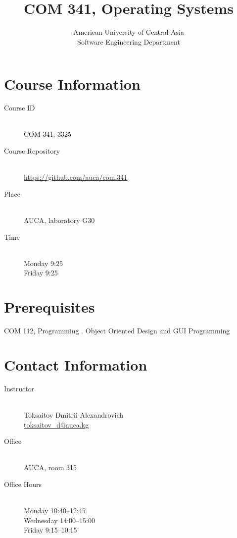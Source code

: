 \documentclass[12pt,a4paper,oneside]{article}
\newcommand{\R}[1]{\uppercase\expandafter{\romannumeral #1\relax}}
\begin{document}
    \title{COM 341, Operating Systems}
    \author{
        American University of Central Asia\\
        Software Engineering Department
    }
    \date{}
    \maketitle

    \section{Course Information}

        \begin{description}
            \item[Course ID]\hfill\\
                COM 341, 3325
            \item[Course Repository]\hfill\\
                \url{https://github.com/auca/com.341}
            \item[Place]\hfill\\
                AUCA, laboratory G30
            \item[Time]\hfill\\
                Monday 9:25\\
                Friday 9:25
        \end{description}

    \section{Prerequisites}

        COM 112, Programming \R{2}. Object Oriented Design and GUI Programming

        \section{Contact Information}

            \begin{description}
                \item[Instructor]\hfill\\
                    Toksaitov Dmitrii Alexandrovich\\
                    \href{mailto:toksaitov_d@auca.kg}{toksaitov\_d@auca.kg}
                \item[Office]\hfill\\
                    AUCA, room 315
                \item[Office Hours]\hfill\\
                    Monday 10:40--12:45\\
                    Wednesday 14:00--15:00\\
                    Friday 9:15--10:15
            \end{description}
\end{document}
